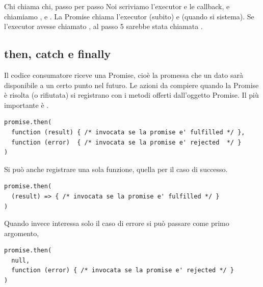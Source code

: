 \begin{esempio}{Chi chiama chi, passo per passo}
Noi scriviamo l'executor e le callback, e chiamiamo ,
 e . La Promise chiama l'executor (subito) e
 (quando si sistema). Se l'executor avesse chiamato
, al passo 5 sarebbe stata chiamata
.
\end{esempio}


\subsection{then, catch e finally}

Il codice consumatore riceve una Promise, cioè la promessa che un dato sarà
disponibile a un certo punto nel futuro. Le azioni da compiere quando la Promise
è risolta (o rifiutata) si registrano con i metodi offerti dall'oggetto Promise.
Il più importante è .

\begin{lstlisting}[style=js]
promise.then(
  function (result) { /* invocata se la promise e' fulfilled */ },
  function (error)  { /* invocata se la promise e' rejected  */ }
)
\end{lstlisting}

Si può anche registrare una sola funzione, quella per il caso di successo.

\begin{lstlisting}[style=js]
promise.then(
  (result) => { /* invocata se la promise e' fulfilled */ }
)
\end{lstlisting}

Quando invece interessa solo il caso di errore si può passare  come
primo argomento,

\begin{lstlisting}[style=js]
promise.then(
  null,
  function (error) { /* invocata se la promise e' rejected */ }
)
\end{lstlisting}

